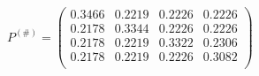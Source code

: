 \documentclass{standalone}
\begin{document}
	$P^{(\#)} = 
	\begin{pmatrix}
		0.3466 & 0.2219 & 0.2226 & 0.2226  \\
		0.2178  & 0.3344 & 0.2226 & 0.2226 \\
		0.2178  & 0.2219 & 0.3322 & 0.2306 \\
		0.2178  & 0.2219 & 0.2226 & 0.3082 \\
	\end{pmatrix}$
\end{document}
